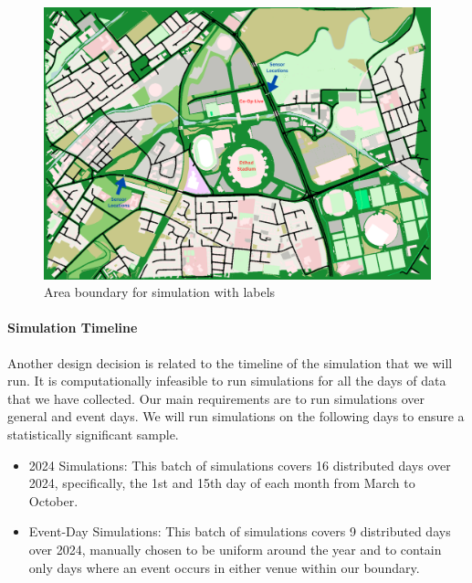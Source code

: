 \begin{figure}[!ht]
  \centering
  \includegraphics[width=\textwidth]{images/design-implementation/sim-area.pdf}
  \caption{Area boundary for simulation with labels}
  \label{fig:sim-area}
\end{figure}

\paragraph{Simulation Timeline}
Another design decision is related to the timeline of the simulation that we will run. It is computationally infeasible to run simulations for all the days of data that we have collected. Our main requirements are to run simulations over general and event days. We will run simulations on the following days to ensure a statistically significant sample.
\begin{itemize}
    \item 2024 Simulations: This batch of simulations covers 16 distributed days over 2024, specifically, the 1st and 15th day of each month from March to October.
    \item Event-Day Simulations: This batch of simulations covers 9 distributed days over 2024, manually chosen to be uniform around the year and to contain only days where an event occurs in either venue within our boundary.
\end{itemize}

